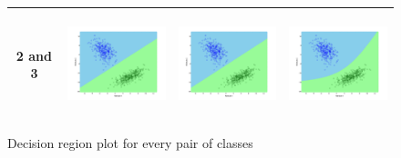 \documentclass[a4paper]{article}
\begin{document}
\begin{figure}
\begin{tabular}{|c|c|c|c|}
					\hline
					2 and
					3&\includegraphics[width=40mm,height=30mm]{bayes/ls/pair/23/all_cov.png}&\includegraphics[width=40mm,height=30mm]{bayes/ls/pair/23/avg_cov.png}
					&\includegraphics[width=40mm,height=30mm]{bayes/ls/pair/23/diff_cov.png}\\
					\hline
				\end{tabular}
				\caption{Decision region plot for every pair of classes}
			\end{figure}
		
			
		
\end{document}
